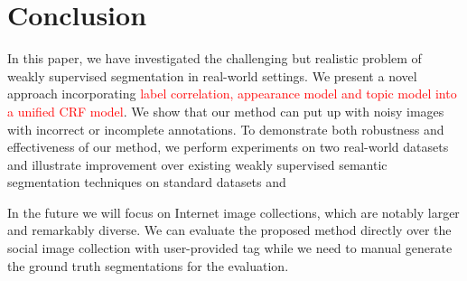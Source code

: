 \section{Conclusion}
In this paper, we have investigated the challenging but realistic problem of weakly supervised segmentation in real-world settings. We present a novel approach incorporating {\textcolor{red}{ label correlation, appearance model and topic model into a unified CRF model}}. We show that our method can put up with noisy images with incorrect or incomplete annotations. To demonstrate both robustness and effectiveness of our method, we perform experiments on two real-world datasets and illustrate improvement over existing weakly supervised semantic segmentation techniques on standard datasets and

In the future we will focus on Internet image collections, which are notably larger and remarkably diverse. We can evaluate the proposed method directly over the social image collection with user-provided tag while we need to manual generate the ground truth segmentations for the evaluation.

